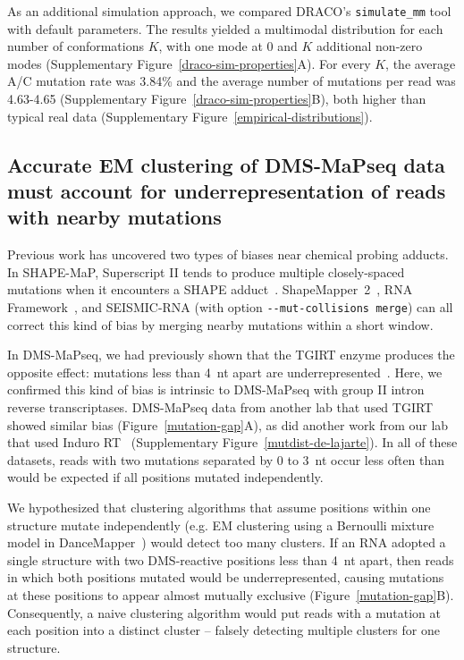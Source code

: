 \documentclass[unnumsec,webpdf,contemporary,large]{oup-authoring-template}%
\theoremstyle{thmstyleone}%
\theoremstyle{thmstyletwo}%
\theoremstyle{thmstylethree}%
\begin{document}
As an additional simulation approach, we compared DRACO's \verb|simulate_mm| tool with default parameters. The results yielded a multimodal distribution for each number of conformations $K$, with one mode at 0 and $K$ additional non-zero modes (Supplementary Figure~\ref{draco-sim-properties}A).
For every $K$, the average A/C mutation rate was 3.84\% and the average number of mutations per read was 4.63-4.65 (Supplementary Figure~\ref{draco-sim-properties}B), both higher than typical real data (Supplementary Figure~\ref{empirical-distributions}).


\subsection{Accurate EM clustering of DMS-MaPseq data must account for underrepresentation of reads with nearby mutations}
\label{mutation-gap-section}

Previous work has uncovered two types of biases near chemical probing adducts.
In SHAPE-MaP, Superscript II tends to produce multiple closely-spaced mutations when it encounters a SHAPE adduct~\cite{Busan2018}.
ShapeMapper~2~\cite{Busan2018}, RNA Framework~\cite{Incarnato2018}, and SEISMIC-RNA (with option \verb|--mut-collisions merge|) can all correct this kind of bias by merging nearby mutations within a short window.

In DMS-MaPseq, we had previously shown that the TGIRT enzyme produces the opposite effect: mutations less than 4~nt apart are underrepresented~\cite{Tomezsko2020}.
Here, we confirmed this kind of bias is intrinsic to DMS-MaPseq with group II intron reverse transcriptases.
DMS-MaPseq data from another lab that used TGIRT~\cite{Morandi2021} showed similar bias (Figure~\ref{mutation-gap}A), as did another work from our lab that used Induro RT~\cite{deLajarte2024} (Supplementary Figure~\ref{mutdist-de-lajarte}).
In all of these datasets, reads with two mutations separated by 0 to 3~nt occur less often than would be expected if all positions mutated independently.

We hypothesized that clustering algorithms that assume positions within one structure mutate independently (e.g. EM clustering using a Bernoulli mixture model in DanceMapper~\cite{Olson2022}) would detect too many clusters.
If an RNA adopted a single structure with two DMS-reactive positions less than 4~nt apart, then reads in which both positions mutated would be underrepresented, causing mutations at these positions to appear almost mutually exclusive (Figure~\ref{mutation-gap}B).
Consequently, a naive clustering algorithm would put reads with a mutation at each position into a distinct cluster -- falsely detecting multiple clusters for one structure.
\end{document}
